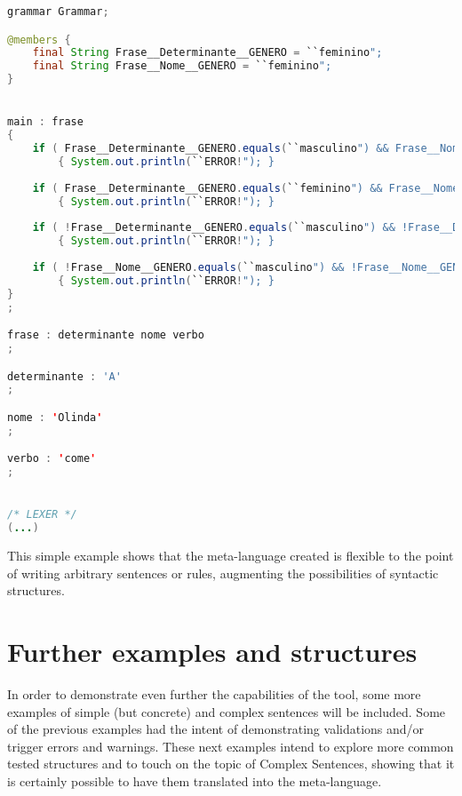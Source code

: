 \begin{center}
\begin{minipage}{15cm}
\begin{lstlisting}[language=java, basicstyle=\tiny, label={lst:case_study_sentence}, caption=Example of a specific generated grammar.]
grammar Grammar;

@members {
    final String Frase__Determinante__GENERO = ``feminino";
    final String Frase__Nome__GENERO = ``feminino";
}


main : frase
{
    if ( Frase__Determinante__GENERO.equals(``masculino") && Frase__Nome__GENERO.equals(``feminino") ) 
        { System.out.println(``ERROR!"); }
	
    if ( Frase__Determinante__GENERO.equals(``feminino") && Frase__Nome__GENERO.equals(``masculino") ) 
        { System.out.println(``ERROR!"); }
	
    if ( !Frase__Determinante__GENERO.equals(``masculino") && !Frase__Determinante__GENERO.equals(``feminino") ) 
        { System.out.println(``ERROR!"); }
	
    if ( !Frase__Nome__GENERO.equals(``masculino") && !Frase__Nome__GENERO.equals(``feminino") ) 
        { System.out.println(``ERROR!"); }
}
;

frase : determinante nome verbo 
;

determinante : 'A'
;

nome : 'Olinda'
;

verbo : 'come'
;


/* LEXER */
(...)
\end{lstlisting}
\end{minipage}
\end{center}


This simple example shows that the meta-language created is flexible to the point of writing arbitrary sentences or rules, 
augmenting the possibilities of syntactic structures.

\section{Further examples and structures}

In order to demonstrate even further the capabilities of the tool, some more examples of simple (but concrete) and complex sentences will be included.
Some of the previous examples had the intent of demonstrating validations and/or trigger errors and warnings.
These next examples intend to explore more common tested structures and to touch on the topic of Complex Sentences,
showing that it is certainly possible to have them translated into the meta-language.

